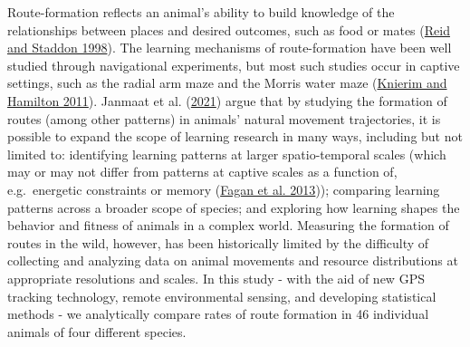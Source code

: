 \documentclass[twoside,12pt,final]{ucthesis-CA2012}
\begin{document}
\begin{ucmainmatter}
Route-formation reflects an animal's ability to build knowledge of the relationships between places and desired outcomes, such as food or mates (\protect\hyperlink{ref-reid1998}{Reid and Staddon 1998}). The learning mechanisms of route-formation have been well studied through navigational experiments, but most such studies occur in captive settings, such as the radial arm maze and the Morris water maze (\protect\hyperlink{ref-knierim2011}{Knierim and Hamilton 2011}). Janmaat et al. (\protect\hyperlink{ref-janmaat2021}{2021}) argue that by studying the formation of routes (among other patterns) in animals' natural movement trajectories, it is possible to expand the scope of learning research in many ways, including but not limited to: identifying learning patterns at larger spatio-temporal scales (which may or may not differ from patterns at captive scales as a function of, e.g.~energetic constraints or memory (\protect\hyperlink{ref-fagan2013}{Fagan et al. 2013})); comparing learning patterns across a broader scope of species; and exploring how learning shapes the behavior and fitness of animals in a complex world. Measuring the formation of routes in the wild, however, has been historically limited by the difficulty of collecting and analyzing data on animal movements and resource distributions at appropriate resolutions and scales. In this study - with the aid of new GPS tracking technology, remote environmental sensing, and developing statistical methods - we analytically compare rates of route formation in 46 individual animals of four different species.


\end{ucmainmatter}
\end{document}
